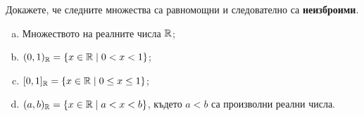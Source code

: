 
\begin{problem}
  Докажете, че следните множества са равномощни и следователно са {\bf неизброими}.
  \begin{enumerate}[a)]
  \item
    Множеството на реалните числа $\mathbb{R}$;
  \item
    $(0,1)_{\mathbb{R}} = \{x \in \mathbb{R} \mid 0 < x < 1\}$;
  \item
    $[0,1]_{\mathbb{R}} = \{x \in \mathbb{R} \mid 0 \leq x \leq 1\}$;
  \item
    $(a,b)_{\mathbb{R}} = \{x \in \mathbb{R} \mid a < x < b\}$, където $a<b$ са произволни реални числа.
  \end{enumerate}
\end{problem}
